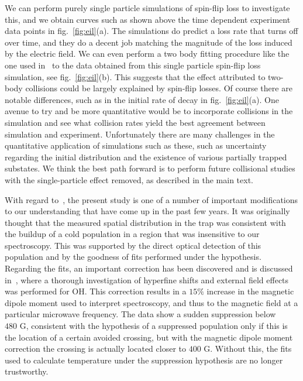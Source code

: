 \documentclass[%
 reprint,
 amsmath,amssymb,
 aps,
prl,
]{revtex4-1}
\begin{document}
We can perform purely single particle simulations of spin-flip loss to investigate this, and we obtain curves such as shown above the time dependent experiment data points in fig.~\ref{fig:eil}(a).
The simulations do predict a loss rate that turns off over time, and they do a decent job matching the magnitude of the loss induced by the electric field.
We can even perform a two body fitting procedure like the one used in~\cite{Stuhl2013} to the data obtained from this single particle spin-flip loss simulation, see fig.~\ref{fig:eil}(b). 
This suggests that the effect attributed to two-body collisions could be largely explained by spin-flip losses.
Of course there are notable differences, such as in the initial rate of decay in fig.~\ref{fig:eil}(a).
One avenue to try and be more quantitative would be to incorporate collisions in the simulation and see what collision rates yield the best agreement between simulation and experiment.
Unfortunately there are many challenges in the quantitative application of simulations such as these, such as uncertainty regarding the initial distribution and the existence of various partially trapped substates.
We think the best path forward is to perform future collisional studies with the single-particle effect removed, as described in the main text.

With regard to~\cite{Stuhl2012evap}, the present study is one of a number of important modifications to our understanding that have come up in the past few years. 
It was originally thought that the measured spatial distribution in the trap was consistent with the buildup of a cold population in a region that was insensitive to our spectroscopy.
This was supported by the direct optical detection of this population and by the goodness of fits performed under the hypothesis.
Regarding the fits, an important correction has been discovered and is discussed in~\cite{Maeda2015}, where a thorough investigation of hyperfine shifts and external field effects was performed for OH.
This correction results in a $15\%$ increase in the magnetic dipole moment used to interpret spectroscopy, and thus to the magnetic field at a particular microwave frequency. 
The data show a sudden suppression below $480\text{ G}$, consistent with the hypothesis of a suppressed population only if this is the location of a certain avoided crossing, but with the magnetic dipole moment correction the crossing is actually located closer to $400\text{ G}$.
Without this, the fits used to calculate temperature under the suppression hypothesis are no longer trustworthy. 
\end{document}
